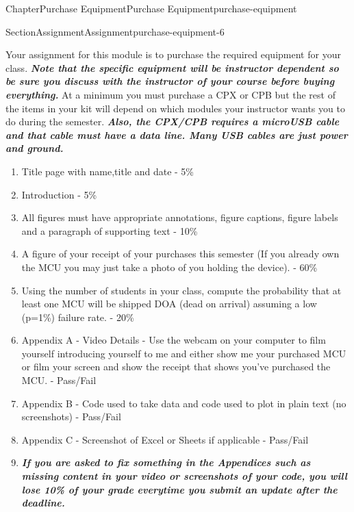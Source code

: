 \documentclass[oneside,10pt,]{book}
\newcommand{\alert}[1]{\textbf{\textit{#1}}}
\numberwithin{equation}{section}
\begin{document}
\begin{chapterptx}{Chapter}{Purchase Equipment}{}{Purchase Equipment}{}{}{purchase-equipment}
\begin{sectionptx}{Section}{Assignment}{}{Assignment}{}{}{purchase-equipment-6}
\begin{introduction}{}
Your assignment for this module is to purchase the required equipment for your class. \alert{Note that the specific equipment will be instructor dependent so be sure you discuss with the instructor of your course before buying everything.} At a minimum you must purchase a CPX or CPB but the rest of the items in your kit will depend on which modules your instructor wants you to do during the semester. \alert{Also, the CPX\slash{}CPB requires a microUSB cable and that cable must have a data line. Many USB cables are just power and ground.}%
%
\begin{enumerate}
\item{}Title page with name,title and date - 5\%%
\item{}Introduction - 5\%%
\item{}All figures must have appropriate annotations, figure captions, figure labels and a paragraph of supporting text - 10\%%
\item{}A figure of your receipt of your purchases this semester (If you already own the MCU you may just take a photo of you holding the device). - 60\%%
\item{}Using the number of students in your class, compute the probability that at least one MCU will be shipped DOA (dead on arrival) assuming a low (p=1\%) failure rate. - 20\%%
\item{}Appendix A - Video Details - Use the webcam on your computer to film yourself introducing yourself to me and either show me your purchased MCU or film your screen and show the receipt that shows you've purchased the MCU. - Pass\slash{}Fail%
\item{}Appendix B - Code used to take data and code used to plot in plain text (no screenshots) - Pass\slash{}Fail%
\item{}Appendix C - Screenshot of Excel or Sheets if applicable - Pass\slash{}Fail%
\item{}\alert{If you are asked to fix something in the Appendices such as missing content in your video or screenshots of your code, you will lose 10\% of your grade everytime you submit an update after the deadline.}%
\end{enumerate}
\end{introduction}%
\end{sectionptx}
\end{chapterptx}
%
%
\typeout{************************************************}
\typeout{************************************************}
%
\end{document}
